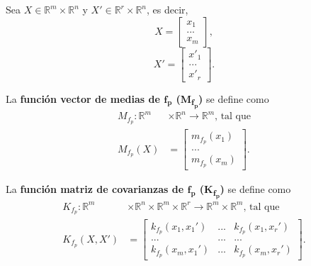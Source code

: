 \begin{defin*}
Sea $X \in \mathbb{R}^m \times \mathbb{R}^n$ y $X' \in \mathbb{R}^r \times \mathbb{R}^n$, es decir,
\begin{equation*}
    X =     
    \left[
        \begin{array}{c}
        x_1  \\
        ... \\
        x_m
        \end{array}
    \right],
\end{equation*}
\begin{equation*}
    X' =     
    \left[
        \begin{array}{c}
        x'_1  \\
        ... \\
        x'_r
        \end{array}
    \right].
\end{equation*}

La \textbf{función vector de medias de $\bm{f_p}$ (M\textsubscript{$\bm{f_p}$})} se define como
\begin{equation*}
\begin{aligned}
    M_{f_p}: \mathbb{R}^m &\times \mathbb{R}^n \rightarrow \mathbb{R}^m
    \text{, tal que}\\
    M_{f_p}(X) &=     
    \left[
        \begin{array}{c}
        m_{f_p}(x_1)  \\
        ... \\
        m_{f_p}(x_m)
        \end{array}
    \right].
\end{aligned}
\end{equation*}

La \textbf{función matriz de covarianzas de $\bm{f_p}$ (K\textsubscript{$\bm{f_p}$})} se define como
\begin{equation*}
\begin{aligned}
    K_{f_p}: \mathbb{R}^m &\times \mathbb{R}^n \times \mathbb{R}^m \times \mathbb{R}^r \rightarrow \mathbb{R}^m \times \mathbb{R}^m
    \text{, tal que}\\
    K_{f_p}(X,X') &=     
    \left[
        \begin{array}{ccc}
        k_{f_p}(x_1,x_1') & ... & k_{f_p}(x_1,x_r')  \\
        ... & ... & ... \\
        k_{f_p}(x_m,x_1') & ... & k_{f_p}(x_m,x_r')
        \end{array}
    \right].
\end{aligned}
\end{equation*}
\end{defin*}

